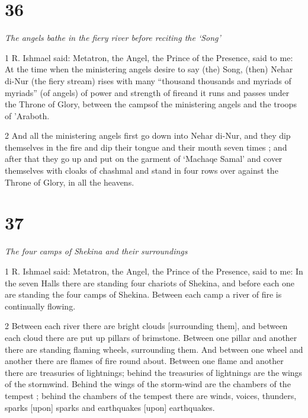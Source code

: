 \chapter{36}

\par \textit{The angels bathe in the fiery river before reciting the ‘Song’}

\par 1 R. Ishmael said: Metatron, the Angel, the Prince of the Presence, said to me: At the time when the ministering angels desire to say (the) Song, (then) Nehar di-Nur (the fiery stream) rises with many “thousand thousands and myriads of myriads” (of angels) of power and strength of fireand it runs and passes under the Throne of Glory, between the campsof the ministering angels and the troops of 'Araboth. 

\par 2 And all the ministering angels first go down into Nehar di-Nur, and they dip themselves in the fire and dip their tongue and their mouth seven times ; and after that they go up and put on the garment of ‘Machaqe Samal’ and cover themselves with cloaks of chashmal and stand in four rows over against the Throne of Glory, in all the heavens. 


\chapter{37}

\par \textit{The four camps of Shekina and their surroundings}

\par 1 R. Ishmael said: Metatron, the Angel, the Prince of the Presence, said to me: In the seven Halls there are standing four chariots of Shekina, and before each one are standing the four camps of Shekina. Between each camp a river of fire is continually flowing. 

\par 2 Between each river there are bright clouds [surrounding them], and between each cloud there are put up pillars of brimstone. Between one pillar and another there are standing flaming wheels, surrounding them. And between one wheel and another there are flames of fire round about. Between one flame and another there are treasuries of lightnings; behind the treasuries of lightnings are the wings of the stormwind. Behind the wings of the storm-wind are the chambers of the tempest ; behind the chambers of the tempest there are winds, voices, thunders, sparks [upon] sparks and earthquakes [upon] earthquakes. 


